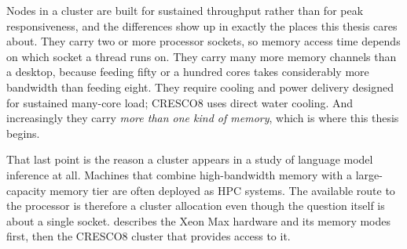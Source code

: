 Nodes in a cluster are built for sustained throughput rather than for
peak responsiveness, and the differences show up in exactly the places
this thesis cares about.  They carry two or more processor sockets, so
memory access time depends on which socket a thread runs on.  They
carry many more memory channels than a desktop, because feeding fifty
or a hundred cores takes considerably more bandwidth than feeding
eight.  They require cooling and power delivery designed for sustained
many-core load; CRESCO8 uses direct water cooling.  And
increasingly they carry \emph{more than one kind of memory}, which is
where this thesis begins.

That last point is the reason a cluster appears in a study of language
model inference at all.  Machines that combine high-bandwidth memory
with a large-capacity memory tier are often deployed as HPC systems.
The available route to the processor is therefore a cluster allocation
even though the question itself is about a single socket.
 describes the Xeon Max hardware
and its memory modes first, then the CRESCO8 cluster that provides
access to it.
